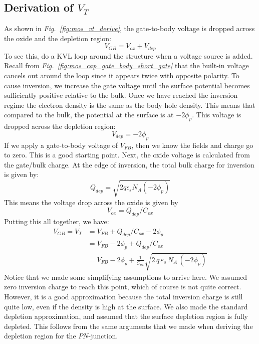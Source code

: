 \subsection{Derivation of \texorpdfstring{$V_T$}{Threshold Voltage}}
As shown in \emph{Fig.~\ref{fig:mos_vt_derive}}, the gate-to-body voltage is dropped across the oxide and the depletion region:
    \begin{equation*}
        V_{GB} = V_{ox} + V_{dep}
    \end{equation*}
To see this, do a KVL loop around the structure when a voltage source is added.  Recall from \emph{Fig.~\ref{fig:mos_cap_gate_body_short_gate}} that the built-in voltage cancels out around the loop since it appears twice with opposite polarity.  To cause inversion, we increase the gate voltage until the surface potential becomes sufficiently positive relative to the bulk.  Once we have reached the inversion regime the electron density is the same as the body hole density.  This means that compared to the bulk, the potential at the surface is at $-2\phi_p$.  This voltage is dropped across the depletion region:
    \begin{equation*}
        V_{dep} = -2 \phi_p
    \end{equation*}
If we apply a gate-to-body voltage of $V_{FB}$, then we know the fields and charge go to zero. This is a good starting point.  Next, the oxide voltage is calculated from the gate/bulk charge.  At the edge of inversion, the total bulk charge for inversion is given by:
    \begin{equation*}
        Q_{dep} = \sqrt{2 q \epsilon_s N_A (-2 \phi_p) }
    \end{equation*}
This means the voltage drop across the oxide is given by
    \begin{equation*}
        V_{ox} = Q_{dep} / C_{ox} 
    \end{equation*}
Putting this all together, we have:
    \begin{align*}
        V_{GB} = V_T &= V_{FB} + Q_{dep}/C_{ox} - 2 \phi_p\\[0.3cm]
        &= V_{FB} - 2 \phi_p + Q_{dep}/C_{ox}\\[0.1cm]
        &= V_{FB} - 2 \phi_p + \frac{1}{C_{ox}} \sqrt{2\,q\,\varepsilon _s\,N_A\,(-2\phi_p)}
    \end{align*}
Notice that we made some simplifying assumptions to arrive here.  We assumed zero inversion charge to reach this point, which of course is not quite correct.  However, it is a good approximation because the total inversion charge is still quite low, even if the density is high at the surface.  We also made the standard depletion approximation, and assumed that the surface depletion region is fully depleted.  This follows from the same arguments that we made when deriving the depletion region for the $PN$-junction.
